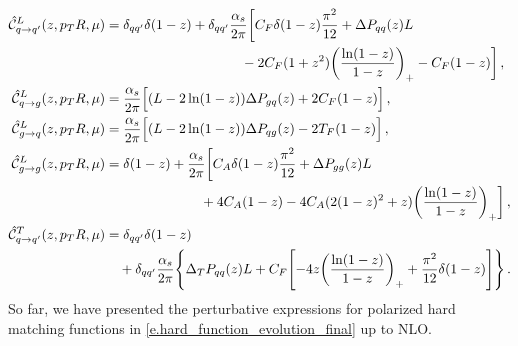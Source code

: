 \documentclass[a4paper, 11 pt]{article}
\begin{document}
\begin{align}
\hat{\mathcal{C}}^L_{q \rightarrow q'} \pqty{z, p_TR, \mu}
& =
\delta _{qq'} \delta (1-z)
+
\delta _{qq'} \frac{\alpha _s}{2 \pi}
\bigg[C_F \delta (1-z) \frac{\pi ^2}{12}
+ \Delta P_{qq}(z) L
\nonumber \\
& \qquad \qquad \qquad \qquad \qquad
-2 C_F (1+z^2) \pqty{\frac{\ln(1-z)}{1-z}}_+ - C_F (1-z) \bigg]
\, , \\
\hat{\mathcal{C}}^L_{q \rightarrow g} \pqty{z, p_TR, \mu}
& =
\frac{\alpha _s}{2 \pi} \Big[\pqty{L - 2 \ln(1-z)} \Delta P_{gq}(z) + 2 C_F (1-z) \Big]
\, , \\
\hat{\mathcal{C}}^L_{g \rightarrow q} \pqty{z, p_TR, \mu}
& =
\frac{\alpha _s}{2 \pi} \Big[\pqty{L - 2 \ln(1-z)} \Delta P_{qg}(z) - 2 T_F (1-z) \Big]
\, , \\
\hat{\mathcal{C}}^L_{g \rightarrow g} \pqty{z, p_TR, \mu}
& =
\delta (1-z)
+
\frac{\alpha _s}{2 \pi} \bigg[C_A \delta (1-z) \frac{\pi ^2}{12} + \Delta P_{gg}(z) L
\nonumber \\
& \qquad \qquad \qquad \quad +
4 C_A (1-z) - 4 C_A (2(1-z)^2 + z) \pqty{\frac{\ln(1-z)}{1-z}}_+ \bigg]
\, , \\
\hat{\mathcal{C}}^T_{q \rightarrow q'} \pqty{z, p_TR, \mu}
& =
\delta _{qq'} \delta(1-z)
\nonumber \\
& \quad +
\delta _{qq'} \frac{\alpha _s}{2 \pi} \Bqty{\Delta_T P_{qq}(z) L + C_F \bqty{-4z \pqty{\frac{\ln(1-z)}{1-z}}_+ + \frac{\pi ^2}{12} \delta (1-z)}}
\, .
\end{align}
So far, we have presented the perturbative expressions for polarized hard matching functions in \cref{e.hard_function_evolution_final} up to NLO.



\end{document}
